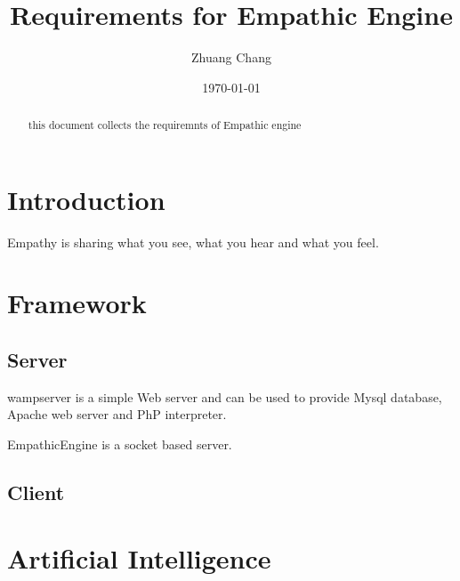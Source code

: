 \documentclass{article}
\begin{document}
\title{Requirements for Empathic Engine}
\author{Zhuang Chang}
\date{\today}
\maketitle
\begin{abstract}
this document collects the requiremnts of Empathic engine

\end{abstract}
\tableofcontents

\section{Introduction}
Empathy is sharing what you see, what you hear and what you
feel.
\section{Framework}
\subsection{Server}
wampserver is a simple Web server and can be used
to provide Mysql database, Apache web server and PhP
interpreter.

EmpathicEngine is a socket based server.
\subsection{Client}

\section{Artificial Intelligence}
\end{document}
